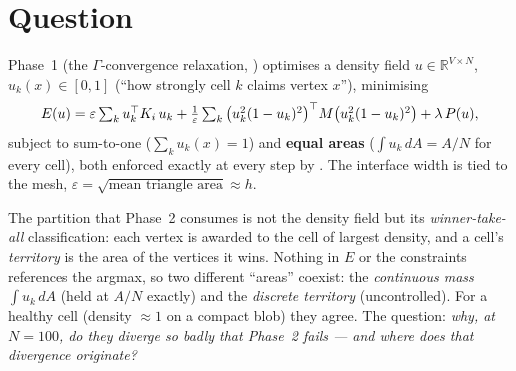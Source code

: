 \documentclass[11pt,a4paper]{article}
\begin{document}
\begin{abstract}
\textbf{Status: measured.} Phase~1 minimises a \(\Gamma\)-convergence energy over
\emph{continuous density functions} and enforces equal areas on them; the actual
partition is then extracted by a \emph{winner-take-all} (argmax) hard decision.
These two representations disagree at high \(N\): a cell can hold its full
continuous mass \(\int u_k\,dA = A/N\) exactly while its discrete winner-take-all
territory is a fraction of \(A/N\). On the torus at \(N=100\), two runs failed
Phase~2 perimeter refinement --- the perimeter \emph{rose} every iteration and the
solver stopped at a point of local infeasibility --- because one such ``runt''
cell makes the Phase~2 equal-area constraint infeasible from iteration~0. Tracking
every cell's territory across all five refinement levels shows the decisive fact:
the seeded initial condition is \emph{equally unequal} for the working \(N=50\) run
and both failing \(N=100\) runs, but the relaxation equalises the \emph{bulk} in
every case and, at \(N=100\), does so by \emph{sacrificing a single cell}. The runt
is therefore \textbf{manufactured during relaxation}, at the level where cells
condense into compact blobs, and only at high \(N\); it is not inherited from the
initial condition, and a finer mesh deepens rather than heals it.
\end{abstract}

\section{Question}
Phase~1 (the \(\Gamma\)-convergence relaxation, )
optimises a density field \(u\in\mathbb{R}^{V\times N}\), \(u_k(x)\in[0,1]\)
(``how strongly cell \(k\) claims vertex \(x\)''), minimising
\[
E(u)=\varepsilon\textstyle\sum_k u_k^{\top}K_{i}\,u_k
 +\tfrac{1}{\varepsilon}\sum_k \big(u_k^2(1-u_k)^2\big)^{\top}M\big(u_k^2(1-u_k)^2\big)
 +\lambda\,P(u),
\]
subject to sum-to-one (\(\sum_k u_k(x)=1\)) and \textbf{equal areas}
(\(\int u_k\,dA = A/N\) for every cell), both enforced exactly at every step by
. The interface width is tied to the
mesh, \(\varepsilon=\sqrt{\text{mean triangle area}}\approx h\).

The partition that Phase~2 consumes is not the density field but its
\emph{winner-take-all} classification: each vertex is awarded to the cell of
largest density, and a cell's \emph{territory} is the area of the vertices it
wins. Nothing in \(E\) or the constraints references the argmax, so two different
``areas'' coexist: the \emph{continuous mass} \(\int u_k\,dA\) (held at \(A/N\)
exactly) and the \emph{discrete territory} (uncontrolled). For a healthy cell
(density \(\approx 1\) on a compact blob) they agree. The question: \emph{why, at
\(N=100\), do they diverge so badly that Phase~2 fails --- and where does that
divergence originate?}
\end{document}
